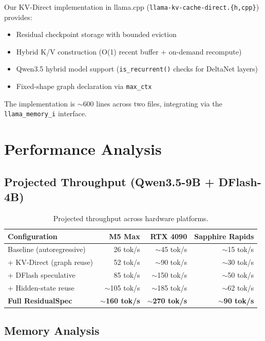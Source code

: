 \documentclass[11pt]{article}
\begin{document}
Our KV-Direct implementation in llama.cpp (\texttt{llama-kv-cache-direct.\{h,cpp\}}) provides:
\begin{itemize}
    \item Residual checkpoint storage with bounded eviction
    \item Hybrid K/V construction (O(1) recent buffer + on-demand recompute)
    \item Qwen3.5 hybrid model support (\texttt{is\_recurrent()} checks for DeltaNet layers)
    \item Fixed-shape graph declaration via \texttt{max\_ctx}
\end{itemize}

The implementation is $\sim$600 lines across two files, integrating via the \texttt{llama\_memory\_i} interface.

\section{Performance Analysis}

\subsection{Projected Throughput (Qwen3.5-9B + DFlash-4B)}

\begin{table}[h]
\centering
\caption{Projected throughput across hardware platforms.}
\label{tab:throughput}
\begin{tabular}{lrrr}
\toprule
\textbf{Configuration} & \textbf{M5 Max} & \textbf{RTX 4090} & \textbf{Sapphire Rapids} \\
\midrule
Baseline (autoregressive) & 26 tok/s & $\sim$45 tok/s & $\sim$15 tok/s \\
+ KV-Direct (graph reuse) & 52 tok/s & $\sim$90 tok/s & $\sim$30 tok/s \\
+ DFlash speculative & 85 tok/s & $\sim$150 tok/s & $\sim$50 tok/s \\
+ Hidden-state reuse & $\sim$105 tok/s & $\sim$185 tok/s & $\sim$62 tok/s \\
\textbf{Full ResidualSpec} & \textbf{$\sim$160 tok/s} & \textbf{$\sim$270 tok/s} & \textbf{$\sim$90 tok/s} \\
\bottomrule
\end{tabular}
\end{table}

\subsection{Memory Analysis}
\end{document}
